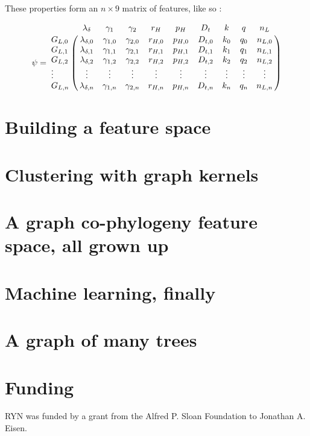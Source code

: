 \documentclass[
10pt, %
a4paper, %
oneside, %
headinclude,footinclude, %
BCOR5mm, %
]{scrartcl}
\begin{document}
\noindent These properties form an $n\times 9$ matrix of features, like so :

\begin{equation}
\psi =
\bordermatrix{
        & \lambda_{\delta}   & \gamma_{1}   & \gamma_{2}   & r_{H}   & p_{H}   & D_{t}   & k      & q      & n_{L}   \cr
G_{L,0} & \lambda_{\delta,0} & \gamma_{1,0} & \gamma_{2,0} & r_{H,0} & p_{H,0} & D_{t,0} & k_{0}  & q_{0}  & n_{L,0} \cr
G_{L,1} & \lambda_{\delta,1} & \gamma_{1,1} & \gamma_{2,1} & r_{H,1} & p_{H,1} & D_{t,1} & k_{1}  & q_{1}  & n_{L,1} \cr
G_{L,2} & \lambda_{\delta,2} & \gamma_{1,2} & \gamma_{2,2} & r_{H,2} & p_{H,2} & D_{t,2} & k_{2}  & q_{2}  & n_{L,2} \cr
\vdots  & \vdots             & \vdots       & \vdots       & \vdots  & \vdots  & \vdots  & \vdots & \vdots & \vdots  \cr 
G_{L,n} & \lambda_{\delta,n} & \gamma_{1,n} & \gamma_{2,n} & r_{H,n} & p_{H,n} & D_{t,n} & k_{n}  & q_{n}  & n_{L,n} \cr
}
\end{equation}

\section{Building a feature space}

\section{Clustering with graph kernels}

\section{A graph co-phylogeny feature space, all grown up}

\section{Machine learning, finally}

\section{A graph of many trees}



\section{Funding}

RYN was funded by a grant from the Alfred P. Sloan Foundation to Jonathan A. Eisen.

\printbibliography[heading=subbibliography]

\clearpage


\end{document}
